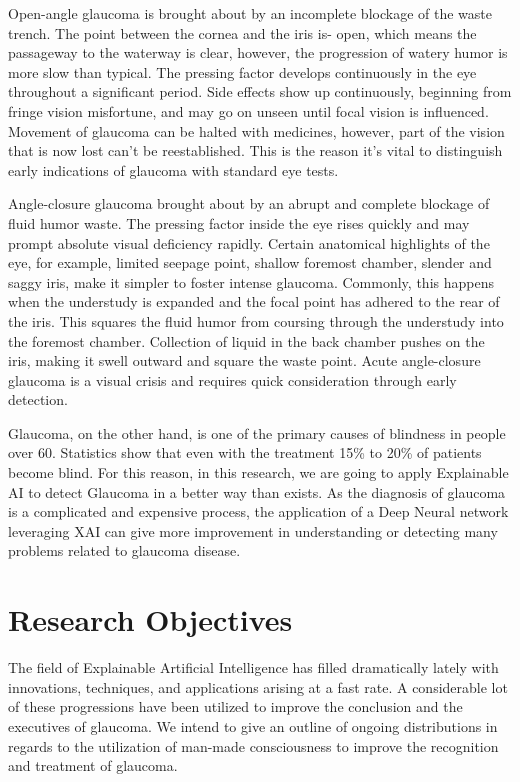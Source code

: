 \vspace{5mm}
\noindent Open-angle glaucoma is brought about by an incomplete blockage of the waste trench. The point between the cornea and the iris is- open, which means the passageway to the waterway is clear, however, the progression of watery humor is more slow than typical. The pressing factor develops continuously in the eye throughout a significant period. Side effects show up continuously, beginning from fringe vision misfortune, and may go on unseen until focal vision is influenced. Movement of glaucoma can be halted with medicines, however, part of the vision that is now lost can’t be reestablished. This is the reason it’s vital to distinguish early indications of glaucoma with standard eye tests.

\vspace{5mm}
\noindent Angle-closure glaucoma brought about by an abrupt and complete blockage of fluid humor waste. The pressing factor inside the eye rises quickly and may prompt absolute visual deficiency rapidly. Certain anatomical highlights of the eye, for example, limited seepage point, shallow foremost chamber, slender and saggy iris, make it simpler to foster intense glaucoma. Commonly, this happens when the understudy is expanded and the focal point has adhered to the rear of the iris. This squares the fluid humor from coursing through the understudy into the foremost chamber. Collection of liquid in the back chamber pushes on the iris, making it swell outward and square the waste point. Acute angle-closure glaucoma is a visual crisis and requires quick consideration through early detection.

\vspace{5mm}
\noindent Glaucoma, on the other hand, is one of the primary causes of blindness in people over 60. Statistics show that even with the treatment 15\% to 20\% of patients become blind. For this reason, in this research, we are going to apply Explainable AI to detect Glaucoma in a better way than exists. As the diagnosis of glaucoma is a complicated and expensive process, the application of a Deep Neural network leveraging XAI can give more improvement in understanding or detecting many problems related to glaucoma disease.


\section{Research Objectives}
The field of Explainable Artificial Intelligence has filled dramatically lately with innovations, techniques, and applications arising at a fast rate. A considerable lot of these progressions have been utilized to improve the conclusion and the executives of glaucoma. We intend to give an outline of ongoing distributions in regards to the utilization of man-made consciousness to improve the recognition and treatment of glaucoma.

